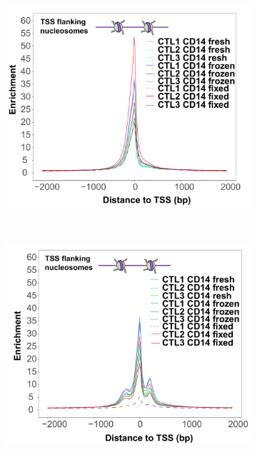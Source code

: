 \begin{figure}[htbp]
\centering
\begin{subfigure}[b]{0.45\textwidth}
\centering 
\includegraphics[width=\textwidth]{./Results1/pdfs/Core_ATAC_CD14_fresh_frozen_fixed_internucleosome_TSS}
\caption{}
\end{subfigure}
~
\begin{subfigure}[b]{0.45\textwidth}
\centering 
\includegraphics[width=\textwidth]{./Results1/pdfs/Core_ATAC_CD14_fresh_frozen_fixed_dinucleosome_TSS}
\caption{}
\end{subfigure}

\end{figure}
